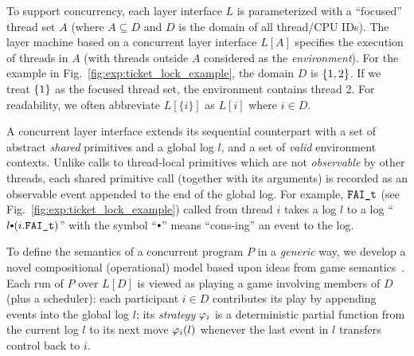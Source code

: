To support concurrency, each layer interface $L$ is parameterized
with a ``focused'' thread set $A$ (where $A \subseteq D$ and $D$ is
the domain of all thread/CPU IDs).  The layer machine
based on a concurrent layer interface $L[A]$ specifies
the execution of threads in $A$ (with threads
outside $A$ considered as the {\em environment}). For the example in Fig.~\ref{fig:exp:ticket_lock_example}, the domain $D$ is $\{1, 2\}$. If we treat $\{1\}$ as the focused thread set, the environment contains thread 2.
For readability,
we often abbreviate $L[\{i\}]$ as $L[i]$ where $i\in{}D$.

A concurrent layer interface extends its sequential counterpart
 with a
set of abstract {\em shared} primitives and a global log $l$, and a set of {\em valid} environment contexts.
Unlike calls to thread-local primitives
which are not {\em observable} by other threads, each shared primitive call (together with its arguments) is recorded as an
observable event appended to the end of the global log. 
For example, ${\mathrm{\texttt{FAI\_t}}}$ (see Fig.~\ref{fig:exp:ticket_lock_example}) called from thread
$i$ takes a log $l$ to a log ``$l \cons (i.\incticket)$'' with the symbol
``$\cons$'' means ``cons-ing'' an event to the log. 

To define the semantics of a concurrent program $P$ in a {\em generic}
way, we develop a novel compositional (operational) model based upon
ideas from game semantics~\cite{gsinvite}. Each run of
$P$ over $L[D]$ is viewed as playing a game involving members of
$D$ (plus a scheduler): each participant $i\in{}D$ contributes its
play by appending events into the global log $l$; its {\em strategy}
$\varphi_{i}$ is a deterministic partial function from
the current log $l$ to its next move $\varphi_{i}(l)$ whenever
the last event in $l$ transfers control back to $i$.


